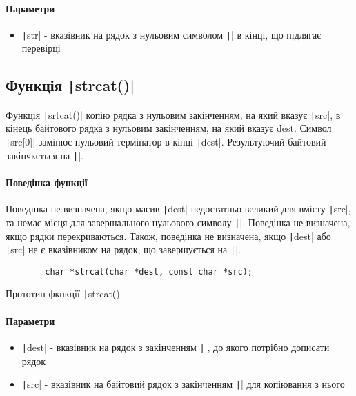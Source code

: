 \paragraph{Параметри}
\begin{itemize}
	\item \texttt|str| - вказівник на рядок з нульовим символом \texttt|\0| в кінці, що підлягає перевірці
\end{itemize}

\subsection[Фкнція \code{strcat()}]{Функція \texttt|strcat()|}
Функція \texttt|srtcat()| копію рядка з нульовим закінченням, на який вказує \texttt|src|, в кінець байтового рядка з нульовим закінченням, на який вказує dest. Символ \texttt|src[0]| замінює нульовий термінатор в кінці \texttt|dest|. Результуючий байтовий закінчкється на \texttt|\0|.
\paragraph{Поведінка функції}
Поведінка не визначена, якщо масив \texttt|dest| недостатньо великий для вмісту \texttt|src|, та немає місця для завершального нульового символу \texttt|\n|. Поведінка не визначена, якщо рядки перекриваються. Також, поведінка не визначена, якщо \texttt|dest| або \texttt|src| не є вказівником на рядок, що завершується на \texttt|\0|.
\begin{listing}[H]
	\begin{verbatim}
		char *strcat(char *dest, const char *src);
	\end{verbatim}
	\caption[Прототип ]{Прототип фкнкції \texttt|strcat()|}
	\label{lst:f:strcat}
\end{listing}
\paragraph{Параметри}
\begin{itemize}
	\item \texttt|dest| - вказівник на рядок з закінченням \texttt|\0|, до якого потрібно дописати рядок
	\item \texttt|src| - вказівник на байтовий рядок з закінченням \texttt|\0| для копіювання з нього
\end{itemize}

